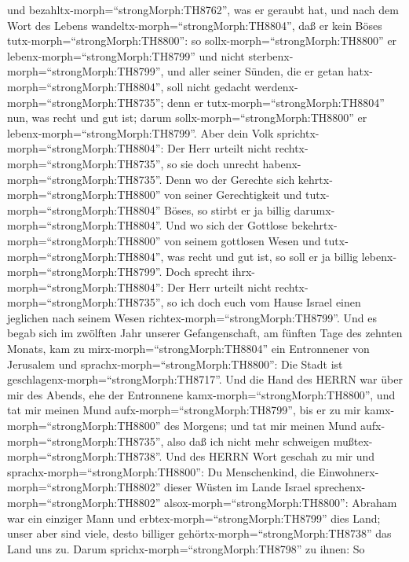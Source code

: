 und bezahltx-morph=``strongMorph:TH8762'', was er geraubt hat, und nach
dem Wort des Lebens wandeltx-morph=``strongMorph:TH8804'', daß er kein
Böses tutx-morph=``strongMorph:TH8800'': so
sollx-morph=``strongMorph:TH8800'' er
lebenx-morph=``strongMorph:TH8799'' und nicht
sterbenx-morph=``strongMorph:TH8799'',  und aller seiner
Sünden, die er getan hatx-morph=``strongMorph:TH8804'', soll nicht
gedacht werdenx-morph=``strongMorph:TH8735''; denn er
tutx-morph=``strongMorph:TH8804'' nun, was recht und gut ist; darum
sollx-morph=``strongMorph:TH8800'' er
lebenx-morph=``strongMorph:TH8799''.  Aber dein Volk
sprichtx-morph=``strongMorph:TH8804'': Der Herr urteilt nicht
rechtx-morph=``strongMorph:TH8735'', so sie doch unrecht
habenx-morph=``strongMorph:TH8735''.  Denn wo der Gerechte
sich kehrtx-morph=``strongMorph:TH8800'' von seiner Gerechtigkeit und
tutx-morph=``strongMorph:TH8804'' Böses, so stirbt er ja billig
darumx-morph=``strongMorph:TH8804''.  Und wo sich der
Gottlose bekehrtx-morph=``strongMorph:TH8800'' von seinem gottlosen
Wesen und tutx-morph=``strongMorph:TH8804'', was recht und gut ist, so
soll er ja billig lebenx-morph=``strongMorph:TH8799''. 
Doch sprecht ihrx-morph=``strongMorph:TH8804'': Der Herr urteilt nicht
rechtx-morph=``strongMorph:TH8735'', so ich doch euch vom Hause Israel
einen jeglichen nach seinem Wesen richtex-morph=``strongMorph:TH8799''.
 Und es begab sich im zwölften Jahr unserer Gefangenschaft,
am fünften Tage des zehnten Monats, kam zu
mirx-morph=``strongMorph:TH8804'' ein Entronnener von Jerusalem und
sprachx-morph=``strongMorph:TH8800'': Die Stadt ist
geschlagenx-morph=``strongMorph:TH8717''.  Und die Hand des
HERRN war über mir des Abends, ehe der Entronnene
kamx-morph=``strongMorph:TH8800'', und tat mir meinen Mund
aufx-morph=``strongMorph:TH8799'', bis er zu mir
kamx-morph=``strongMorph:TH8800'' des Morgens; und tat mir meinen Mund
aufx-morph=``strongMorph:TH8735'', also daß ich nicht mehr schweigen
mußtex-morph=``strongMorph:TH8738''.  Und des HERRN Wort
geschah zu mir und sprachx-morph=``strongMorph:TH8800'': 
Du Menschenkind, die Einwohnerx-morph=``strongMorph:TH8802'' dieser
Wüsten im Lande Israel sprechenx-morph=``strongMorph:TH8802''
alsox-morph=``strongMorph:TH8800'': Abraham war ein einziger Mann und
erbtex-morph=``strongMorph:TH8799'' dies Land; unser aber sind viele,
desto billiger gehörtx-morph=``strongMorph:TH8738'' das Land uns zu.
 Darum sprichx-morph=``strongMorph:TH8798'' zu ihnen: So
